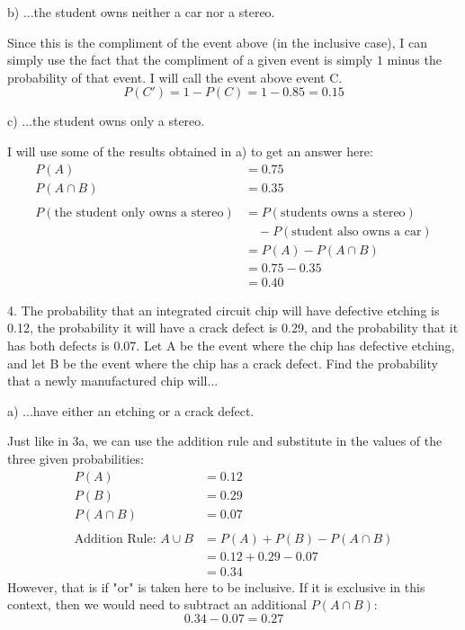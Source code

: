 \documentclass[12pt, letterpaper]{article}
\begin{document}
\qquad b) ...the student owns neither a car nor a stereo.
\begin{center}
	Since this is the compliment of the event above (in the inclusive case), I can simply use the fact that the compliment of a given event is simply $1$ minus the probability of that event. I will call the event above event C.
	$$P(C') = 1 - P(C) = 1 - 0.85 = \boxed{0.15}$$
\end{center}

\pagebreak

\qquad c) ...the student owns only a stereo.
\begin{center}
	I will use some of the results obtained in a) to get an answer here:
	\begin{align*}
		P(A) &= 0.75 \\
		P(A \cap B) &= 0.35 \\
		\\
		P(\text{the student only owns a stereo}) &= P(\text{students owns a stereo}) \\
		&\quad- P(\text{student also owns a car}) \\
		&= P(A) - P(A \cap B) \\
		&= 0.75 - 0.35 \\
		&= \boxed{0.40}
	\end{align*}
\end{center}

4. The probability that an integrated circuit chip will have defective etching is  0.12, the probability it will have a crack defect is 0.29, and the probability that it has both defects is 0.07. Let A be the event where the chip has defective etching, and let B be the event where the chip has a crack defect.  Find the probability that a newly manufactured chip will...

\qquad a) ...have either an etching or a crack defect.
\begin{center}
	Just like in 3a, we can use the addition rule and substitute in the values of the three given probabilities:
	\begin{align*}
		P(A) &= 0.12 \\
		P(B) &= 0.29 \\
		P(A \cap B) &= 0.07 \\
		\\
		\text{Addition Rule: } A \cup B &= P(A) + P(B) - P(A \cap B) \\
		&= 0.12 + 0.29 - 0.07 \\
		&= \boxed{0.34}
	\end{align*}
	However, that is if "or" is taken here to be inclusive. If it is exclusive in this context, then we would need to subtract an additional $P(A \cap B)$:
	$$0.34 - 0.07 = \boxed{0.27}$$
\end{center}
\end{document}
